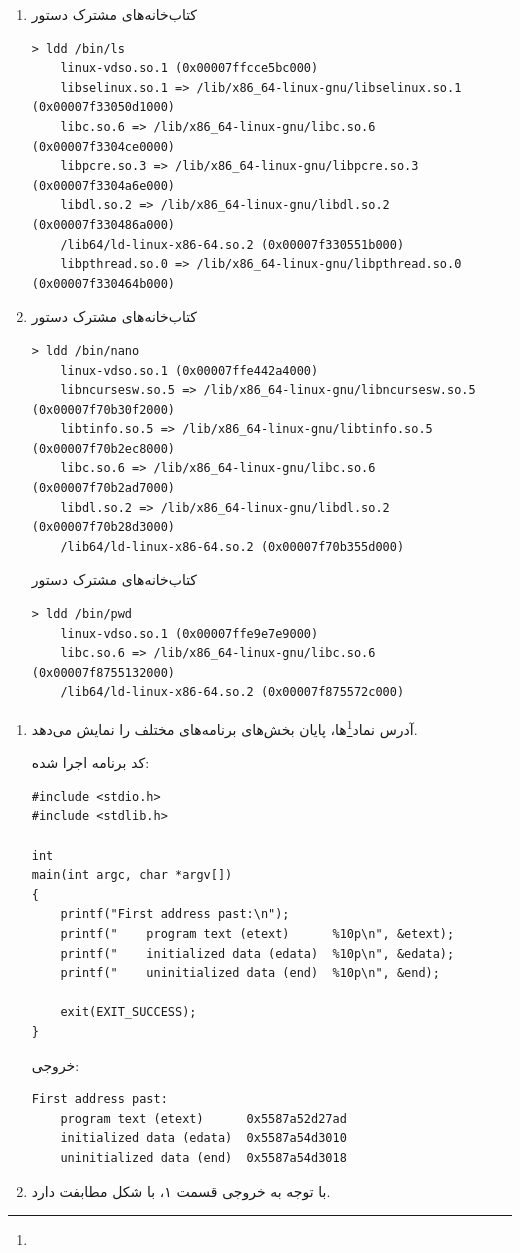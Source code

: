 \newpage


\begin{enumerate}
	\item کتاب‌خانه‌های مشترک دستور 
	\begin{Verbatim}[tabsize=4]
> ldd /bin/ls
	linux-vdso.so.1 (0x00007ffcce5bc000)
	libselinux.so.1 => /lib/x86_64-linux-gnu/libselinux.so.1 (0x00007f33050d1000)
	libc.so.6 => /lib/x86_64-linux-gnu/libc.so.6 (0x00007f3304ce0000)
	libpcre.so.3 => /lib/x86_64-linux-gnu/libpcre.so.3 (0x00007f3304a6e000)
	libdl.so.2 => /lib/x86_64-linux-gnu/libdl.so.2 (0x00007f330486a000)
	/lib64/ld-linux-x86-64.so.2 (0x00007f330551b000)
	libpthread.so.0 => /lib/x86_64-linux-gnu/libpthread.so.0 (0x00007f330464b000)
	\end{Verbatim}
	\item 
	کتاب‌خانه‌های مشترک دستور 
	\begin{Verbatim}[tabsize=4]
> ldd /bin/nano
	linux-vdso.so.1 (0x00007ffe442a4000)
	libncursesw.so.5 => /lib/x86_64-linux-gnu/libncursesw.so.5 (0x00007f70b30f2000)
	libtinfo.so.5 => /lib/x86_64-linux-gnu/libtinfo.so.5 (0x00007f70b2ec8000)
	libc.so.6 => /lib/x86_64-linux-gnu/libc.so.6 (0x00007f70b2ad7000)
	libdl.so.2 => /lib/x86_64-linux-gnu/libdl.so.2 (0x00007f70b28d3000)
	/lib64/ld-linux-x86-64.so.2 (0x00007f70b355d000)
	\end{Verbatim}
	کتاب‌خانه‌های مشترک دستور 
	\begin{Verbatim}[tabsize=4]
> ldd /bin/pwd
	linux-vdso.so.1 (0x00007ffe9e7e9000)
	libc.so.6 => /lib/x86_64-linux-gnu/libc.so.6 (0x00007f8755132000)
	/lib64/ld-linux-x86-64.so.2 (0x00007f875572c000)
	\end{Verbatim}
\end{enumerate}

\newpage
{}

\begin{enumerate}
	\item آدرس نماد\footnote{}ها، پایان بخش‌های برنامه‌های مختلف را نمایش می‌دهد. 

	کد برنامه اجرا شده:
	\begin{Verbatim}[tabsize=4]
#include <stdio.h>
#include <stdlib.h>

int
main(int argc, char *argv[])
{
	printf("First address past:\n");
	printf("    program text (etext)      %10p\n", &etext);
	printf("    initialized data (edata)  %10p\n", &edata);
	printf("    uninitialized data (end)  %10p\n", &end);
	
	exit(EXIT_SUCCESS);
}

	\end{Verbatim}
	
	خروجی:
	
	\begin{Verbatim}[tabsize=4]
First address past:
	program text (etext)      0x5587a52d27ad
	initialized data (edata)  0x5587a54d3010
	uninitialized data (end)  0x5587a54d3018
	\end{Verbatim}
	\item با توجه به خروجی قسمت ۱، با  شکل مطابفت دارد.
	
	
\end{enumerate}
